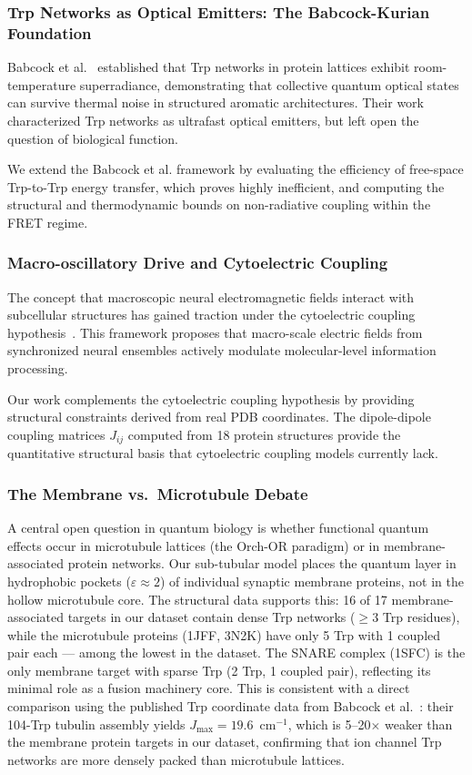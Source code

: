 \documentclass[aps,pre,twocolumn,showpacs,superscriptaddress]{revtex4-2}
\begin{document}
\subsubsection{Trp Networks as Optical Emitters: The Babcock-Kurian Foundation}

Babcock et al.~\cite{Babcock2024} established that Trp networks in protein lattices exhibit room-temperature superradiance, demonstrating that collective quantum optical states can survive thermal noise in structured aromatic architectures. Their work characterized Trp networks as ultrafast optical emitters, but left open the question of biological function.

We extend the Babcock et al. framework by evaluating the efficiency of free-space Trp-to-Trp energy transfer, which proves highly inefficient, and computing the structural and thermodynamic bounds on non-radiative coupling within the FRET regime.

\subsubsection{Macro-oscillatory Drive and Cytoelectric Coupling}

The concept that macroscopic neural electromagnetic fields interact with subcellular structures has gained traction under the cytoelectric coupling hypothesis~\cite{Pinotsis2023}. This framework proposes that macro-scale electric fields from synchronized neural ensembles actively modulate molecular-level information processing.

Our work complements the cytoelectric coupling hypothesis by providing structural constraints derived from real PDB coordinates. The dipole-dipole coupling matrices $J_{ij}$ computed from 18 protein structures provide the quantitative structural basis that cytoelectric coupling models currently lack.

\subsubsection{The Membrane vs.\ Microtubule Debate}

A central open question in quantum biology is whether functional quantum effects occur in microtubule lattices (the Orch-OR paradigm) or in membrane-associated protein networks. Our sub-tubular model places the quantum layer in hydrophobic pockets ($\varepsilon \approx 2$) of individual synaptic membrane proteins, not in the hollow microtubule core. The structural data supports this: 16 of 17 membrane-associated targets in our dataset contain dense Trp networks ($\geq 3$ Trp residues), while the microtubule proteins (1JFF, 3N2K) have only 5 Trp with 1 coupled pair each — among the lowest in the dataset. The SNARE complex (1SFC) is the only membrane target with sparse Trp (2 Trp, 1 coupled pair), reflecting its minimal role as a fusion machinery core. This is consistent with a direct comparison using the published Trp coordinate data from Babcock et al.~\cite{Babcock2024}: their 104-Trp tubulin assembly yields $J_{\max} = 19.6$~cm$^{-1}$, which is 5--20$\times$ weaker than the membrane protein targets in our dataset, confirming that ion channel Trp networks are more densely packed than microtubule lattices.
\end{document}
